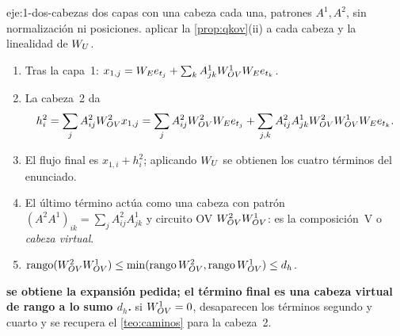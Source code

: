 \begin{solucion}{eje:1-dos-cabezas}
\datos dos capas con una cabeza cada una, patrones $A^{1},A^{2}$, sin normalización ni posiciones.
\planteamiento aplicar la \cref{prop:qkov}(ii) a cada cabeza y la linealidad de $W_{U}$.
\pasos
\begin{enumerate}[label=\arabic*.]
  \item Tras la capa~1: $x_{1,j}=W_{E} e_{t_j}+\sum_kA^{1}_{jk}W_{OV}^{1}W_{E} e_{t_k}$.
  \item La cabeza~2 da
  \[
  h^{2}_i=\sum_jA^{2}_{ij}W_{OV}^{2}x_{1,j}=\sum_jA^{2}_{ij}W_{OV}^{2}W_{E} e_{t_j}+\sum_{j,k}A^{2}_{ij}A^{1}_{jk}W_{OV}^{2}W_{OV}^{1}W_{E} e_{t_k}.
  \]
  \item El flujo final es $x_{1,i}+h^{2}_i$; aplicando $W_{U}$ se obtienen los cuatro términos del enunciado.
  \item El último término actúa como una cabeza con patrón $(A^{2}A^{1})_{ik}=\sum_jA^{2}_{ij}A^{1}_{jk}$ y circuito OV $W_{OV}^{2}W_{OV}^{1}$: es la composición~V o \emph{cabeza virtual}.
  \item $\operatorname{rango}(W_{OV}^{2}W_{OV}^{1})\le\min(\operatorname{rango}W_{OV}^{2},\operatorname{rango}W_{OV}^{1})\le d_h$.
\end{enumerate}
\resultado \textbf{se obtiene la expansión pedida; el término final es una cabeza virtual de rango a lo sumo $d_h$.}
\comprobacion si $W_{OV}^{1}=0$, desaparecen los términos segundo y cuarto y se recupera el \cref{teo:caminos} para la cabeza~2.
\end{solucion}

